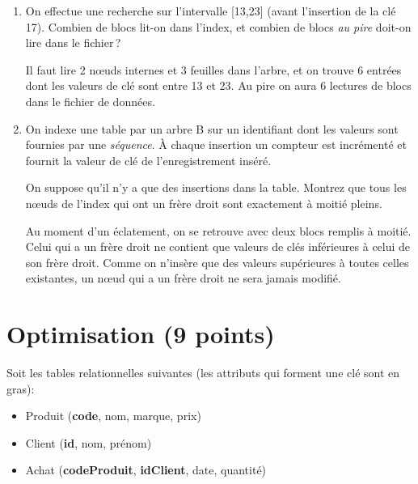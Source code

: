 \begin{enumerate}
  \item On effectue une recherche sur l'intervalle [13,23] (avant l'insertion
  de la clé 17). Combien
  de blocs lit-on dans l'index, et combien de blocs \emph{au pire} doit-on
  lire dans le fichier\,?

\begin{solution}
Il faut lire 2 nœuds internes et 3 feuilles dans l'arbre, et on trouve 
6 entrées dont les valeurs de clé sont entre 13 et 23. Au pire on
aura 6 lectures de blocs dans le fichier de données.
\end{solution}

  \item On indexe une table par un arbre B sur un identifiant
    dont les valeurs sont fournies par une {\em séquence}. À 
   chaque insertion un compteur est incrémenté et fournit la valeur
        de clé de l'enregistrement inséré.

   On suppose qu'il n'y a que des insertions dans la table. Montrez
    que tous les n{\oe}uds de l'index qui ont un  frère droit
    sont exactement à moitié pleins.

\begin{solution}
Au moment d'un éclatement, on se retrouve avec deux blocs
     remplis à moitié. Celui qui a un frère droit ne contient que
     valeurs de clés inférieures à celui de son frère droit.
     Comme on n'insère que des valeurs supérieures à toutes celles
     existantes, un n{\oe}ud qui a un frère droit ne sera jamais modifié.
\end{solution}

\end{enumerate}


\section{Optimisation (9 points)}

Soit les tables relationnelles suivantes (les attributs qui forment 
une clé sont en gras):

\begin{itemize}
  \item Produit  (\textbf{code}, nom, marque, prix)
  \item Client  (\textbf{id}, nom, prénom)
  \item Achat    (\textbf{codeProduit}, \textbf{idClient}, date, quantité)
\end{itemize}


